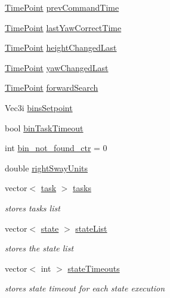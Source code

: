 \begin{DoxyCompactItemize}
\item 
\hyperlink{thruster__driver_8cpp_ad3e807c387dc076de974ff7eac67ad81}{Time\+Point} \hyperlink{classPathPlanner_a4802cdb753da4fa47854e33f3220db84}{prev\+Command\+Time}
\item 
\hyperlink{thruster__driver_8cpp_ad3e807c387dc076de974ff7eac67ad81}{Time\+Point} \hyperlink{classPathPlanner_a5b503e6eba34d4925b07749f3162f659}{last\+Yaw\+Correct\+Time}
\item 
\hyperlink{thruster__driver_8cpp_ad3e807c387dc076de974ff7eac67ad81}{Time\+Point} \hyperlink{classPathPlanner_ab851d5039b0392d1895ee42960e29b2d}{height\+Changed\+Last}
\item 
\hyperlink{thruster__driver_8cpp_ad3e807c387dc076de974ff7eac67ad81}{Time\+Point} \hyperlink{classPathPlanner_af31adaae522a828711bb1c800176cbb9}{yaw\+Changed\+Last}
\item 
\hyperlink{thruster__driver_8cpp_ad3e807c387dc076de974ff7eac67ad81}{Time\+Point} \hyperlink{classPathPlanner_a2164113fa9ab422003bffad0454f5bb0}{forward\+Search}
\item 
Vec3i \hyperlink{classPathPlanner_aede3f213d16ed3f67ba27380de436fa7}{bins\+Setpoint}
\item 
bool \hyperlink{classPathPlanner_a5edcf4d5b37bc7d9969710fd7abb6ba7}{bin\+Task\+Timeout}
\item 
int \hyperlink{classPathPlanner_a4c5f3c04540a24807a55c4292f2f4216}{bin\+\_\+not\+\_\+found\+\_\+ctr} = 0
\item 
double \hyperlink{classPathPlanner_acbca3bbb98637d73964596d2ac0ff38b}{right\+Sway\+Units}
\item 
vector$<$ \hyperlink{PathPlanner_8h_aa4d42044193f96ecc0d82daab68fb0e6}{task} $>$ \hyperlink{classPathPlanner_afaaad3d73c413de1915e48dd7f9ef263}{tasks}
\begin{DoxyCompactList}\small\item\em stores tasks list \end{DoxyCompactList}\item 
vector$<$ \hyperlink{BinsTask_8h_adc6e5733fc3c22f0a7b2914188c49c90}{state} $>$ \hyperlink{classPathPlanner_aef62d7f3ef83d7170d87bfe689d1eecd}{state\+List}
\begin{DoxyCompactList}\small\item\em stores the state list \end{DoxyCompactList}\item 
vector$<$ int $>$ \hyperlink{classPathPlanner_ac1db41115e7596c58fbc5e0a80b7e4cb}{state\+Timeouts}
\begin{DoxyCompactList}\small\item\em stores state timeout for each state execution \end{DoxyCompactList}\end{DoxyCompactItemize}


